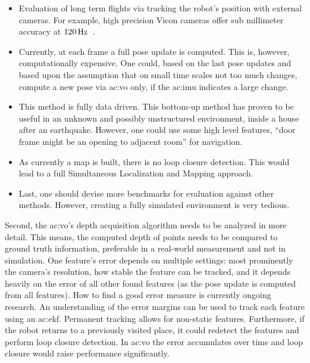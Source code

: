 \begin{itemize}
  \item Evaluation of long term flights via tracking the robot's position with external cameras. For example, high precision Vicon cameras offer sub millimeter accuracy at $\unit[120]{Hz}$~\cite{windolf2008systematic}.
  \item Currently, at each frame a full pose update is computed. This is, however, computationally expensive. One could, based on the last pose updates and based upon the assumption that on small time scales not too much changes, compute a new pose via \gls{ac:vo} only, if the \gls{ac:imu} indicates a large change.
  \item This method is fully data driven. This bottom-up method has proven to be useful in an unknown and possibly unstructured environment, \eg inside a house after an earthquake. However, one could use some high level features, \eg ``door frame might be an opening to adjacent room'' for navigation.
  \item As currently a map is built, there is no loop closure detection. This would lead to a full Simultaneous Localization and Mapping approach.
  \item Last, one should devise more benchmarks for evaluation against other methods. However, creating a fully simulated environment is very tedious.
\end{itemize}


Second, the \gls{ac:vo}'s depth acquisition algorithm needs to be analyzed in more detail.
This means, the computed depth of points needs to be compared to ground truth information, preferable in a real-world measurement and not in simulation.
One feature's error depends on multiple settings: most prominently the camera's resolution, how stable the feature can be tracked, and it depends heavily on the error of all other found features (as the pose update is computed from all features).
How to find a good error measure is currently ongoing research.
An understanding of the error margins can be used to track each feature using an \gls{ac:ekf}.
Permanent tracking allows for non-static features.
Furthermore, if the robot returns to a previously visited place, it could redetect the features and perform loop closure detection.
In \gls{ac:vo} the error accumulates over time and loop closure would raise performance significantly.


